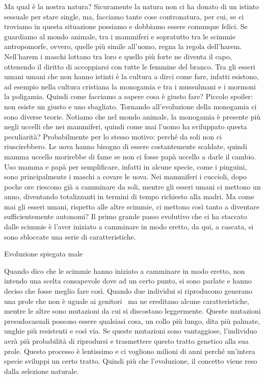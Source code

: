 \documentclass[12pt]{book} %
\begin{document}
Ma qual è la nostra natura? Sicuramente la natura non ci ha donato di un istinto sessuale per stare single, ma, facciamo
tante cose contronatura, per cui, se ci troviamo in questa situazione possiamo e dobbiamo essere comunque felici. Se
guardiamo al mondo animale, tra i mammiferi e sopratutto tra le scimmie antropomorfe, ovvero, quelle più simile
all'uomo, regna la regola dell'harem. Nell'harem i
maschi lottano tra loro e quello più forte ne diventa il capo, ottenendo il diritto di accoppiarsi con tutte le femmine
del branco. Tra gli esseri umani umani che non hanno istinti è la cultura a dirci come fare, infatti esistono, ad
esempio nella cultura cristiana la monogamia e tra i mussulmani e i mormoni la poligamia. Quindi come facciamo a sapere
cosa è giusto fare? Piccolo spoiler: non esiste un giusto e uno sbagliato. Tornando all'evoluzione
della monogamia ci sono diverse teorie. Notiamo che nel mondo animale, la monogamia è presente più negli uccelli che
nei mammiferi, quindi come mai l'uomo ha sviluppato questa peculiarità? Probabilmente per lo
stesso motivo: perché da soli non ci riuscirebbero. Le uova hanno bisogno di essere costantemente scaldate, quindi
mamma uccello morirebbe di fame se non ci fosse papà uccello a darle il cambio. Uso mamma e papà per semplificare,
infatti in alcune specie, come i pinguini, sono principalmente i maschi a covare le uova. Nei mammiferi i cuccioli,
dopo poche ore riescono già a camminare da soli, mentre gli esseri umani ci mettono un anno, diventando totalizzanti in
termini di tempo richiesto alla madri. Ma come mai gli esseri umani, rispetto alle altre scimmie, ci mettono così tanto
a diventare sufficientemente autonomi? Il primo grande passo evolutivo che ci ha staccato dalle scimmie è
l'aver iniziato a camminare in modo eretto, da qui, a cascata, si sono sbloccate una serie di
caratteristiche. 


\bigskip

\begin{mdframed}[linewidth=1pt]
Evoluzione spiegata male

Quando dico che le scimmie hanno iniziato a camminare in modo eretto, non intendo una scelta consapevole dove ad un
certo punto, si sono parlate e hanno deciso che fosse meglio fare così. Quando due individui si riproducono generano
una prole che non è uguale ai genitori \ ma ne ereditano alcune caratteristiche, mentre le altre sono mutazioni da cui
si discostano leggermente. Queste mutazioni presudocasuali possono essere qualsiasi cosa, un collo più lungo, dita più
palmate, unghie più resistenti e così via. Se queste mutazioni sono vantaggiose, l'individuo avrà
più probabilità di riprodursi e trasmettere questo tratto genetico alla sua prole. Questo processo è lentissimo e ci
vogliono milioni di anni perché un'intera specie sviluppi un certo tratto. Quindi più che
l'evoluzione, il concetto viene reso dalla selezione naturale. 
\end{mdframed}
\end{document}

